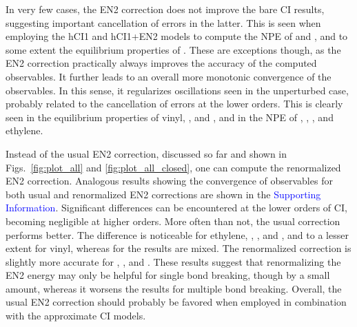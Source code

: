 \documentclass[aip,jcp,reprint,noshowkeys,superscriptaddress]{revtex4-1}
\newcommand{\SupInf}{\textcolor{blue}{Supporting Information}}
\begin{document}
In very few cases, the EN2 correction does not improve the bare CI results, suggesting important cancellation of errors in the latter.
This is seen when employing the hCI1 and hCI1+EN2 models to compute the NPE of  and , and to some extent the equilibrium properties of .
These are exceptions though, as the EN2 correction practically always improves the accuracy of the computed observables.
It further leads to an overall more monotonic convergence of the observables.
In this sense, it regularizes oscillations seen in the unperturbed case, probably related to the cancellation of errors at the lower orders.
This is clearly seen in the equilibrium properties of vinyl, , and ,
and in the NPE of , , , and ethylene.

Instead of the usual EN2 correction, discussed so far and shown in Figs.~\ref{fig:plot_all} and \ref{fig:plot_all_closed},
one can compute the renormalized EN2 correction. \cite{Garniron_2019}
Analogous results showing the convergence of observables for both usual and renormalized EN2 corrections are shown in the {\SupInf}.
Significant differences can be encountered at the lower orders of CI, becoming negligible at higher orders.
More often than not, the usual correction performs better.
The difference is noticeable for ethylene, , , and , and to a lesser extent for vinyl,
whereas for  the results are mixed.
The renormalized correction is slightly more accurate for , , and .
These results suggest that renormalizing the EN2 energy may only be helpful for single bond breaking, though by a small amount,
whereas it worsens the results for multiple bond breaking.
Overall, the usual EN2 correction should probably be favored when employed in combination with the approximate CI models.
\end{document}
